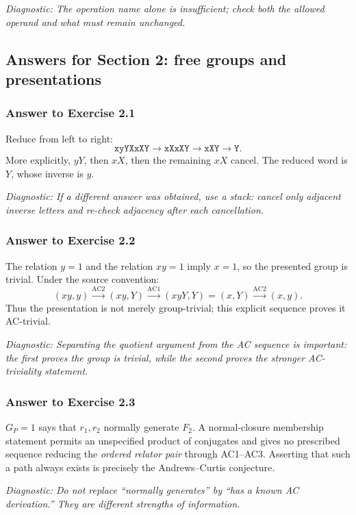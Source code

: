 \documentclass[11pt]{article}
\theoremstyle{definition}
\theoremstyle{remark}
\newcommand{\F}{F_2}
\newcommand{\AC}{\mathrm{AC}}
\newcommand{\diagnostic}[1]{\par\smallskip\textit{Diagnostic: #1}}
\begin{document}
\diagnostic{The operation name alone is insufficient; check both the
allowed operand and what must remain unchanged.}

\subsection*{Answers for Section 2: free groups and presentations}

\subsubsection*{Answer to Exercise 2.1}

Reduce from left to right:
\[
\texttt{xyYXxXY}
\longrightarrow \texttt{xXxXY}
\longrightarrow \texttt{xXY}
\longrightarrow \texttt{Y}.
\]
More explicitly, \(yY\), then \(xX\), then the remaining \(xX\) cancel.
The reduced word is \(Y\), whose inverse is \(y\).

\diagnostic{If a different answer was obtained, use a stack: cancel only
adjacent inverse letters and re-check adjacency after each cancellation.}

\subsubsection*{Answer to Exercise 2.2}

The relation \(y=1\) and the relation \(xy=1\) imply \(x=1\), so the
presented group is trivial.  Under the source convention:
\[
(xy,y)\xrightarrow{\AC2}(xy,Y)
\xrightarrow{\AC1}(xyY,Y)=(x,Y)
\xrightarrow{\AC2}(x,y).
\]
Thus the presentation is not merely group-trivial; this explicit sequence
proves it AC-trivial.

\diagnostic{Separating the quotient argument from the AC sequence is
important: the first proves the group is trivial, while the second proves
the stronger AC-triviality statement.}

\subsubsection*{Answer to Exercise 2.3}

\(G_P=1\) says that \(r_1,r_2\) normally generate \(\F\).  A normal-closure
membership statement permits an unspecified product of conjugates and gives
no prescribed sequence reducing the \emph{ordered relator pair} through
AC1--AC3.  Asserting that such a path always exists is precisely the
Andrews--Curtis conjecture.

\diagnostic{Do not replace ``normally generates'' by ``has a known AC
derivation.''  They are different strengths of information.}
\end{document}
